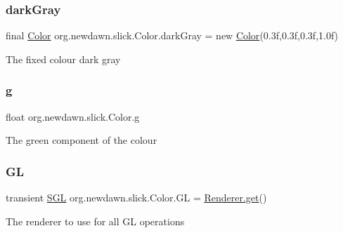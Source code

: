 \subsubsection{\texorpdfstring{dark\+Gray}{darkGray}}
{\footnotesize\ttfamily final \mbox{\hyperlink{classorg_1_1newdawn_1_1slick_1_1_color}{Color}} org.\+newdawn.\+slick.\+Color.\+dark\+Gray = new \mbox{\hyperlink{classorg_1_1newdawn_1_1slick_1_1_color}{Color}}(0.\+3f,0.\+3f,0.\+3f,1.\+0f)\hspace{0.3cm}{\ttfamily [static]}}

The fixed colour dark gray \mbox{\label{classorg_1_1newdawn_1_1slick_1_1_color_aa6ebff7c102a1476e7b511a78397b753}} 
\subsubsection{\texorpdfstring{g}{g}}
{\footnotesize\ttfamily float org.\+newdawn.\+slick.\+Color.\+g}

The green component of the colour \mbox{\label{classorg_1_1newdawn_1_1slick_1_1_color_a7b30c78e29cffe055c92a2118ce3164a}} 
\subsubsection{\texorpdfstring{GL}{GL}}
{\footnotesize\ttfamily transient \mbox{\hyperlink{interfaceorg_1_1newdawn_1_1slick_1_1opengl_1_1renderer_1_1_s_g_l}{S\+GL}} org.\+newdawn.\+slick.\+Color.\+GL = \mbox{\hyperlink{classorg_1_1newdawn_1_1slick_1_1opengl_1_1renderer_1_1_renderer_abe742c3a7dfca67c6c01821d27087308}{Renderer.\+get}}()\hspace{0.3cm}{\ttfamily [protected]}}

The renderer to use for all GL operations \mbox{\label{classorg_1_1newdawn_1_1slick_1_1_color_a51bc0a8031fa678db5b35c26696b1d9f}} 
